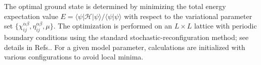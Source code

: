 \documentclass[reprint,superscriptaddress,amsmath,amssymb,aps,twocolumn]{revtex4-1}
\begin{document}
The optimal ground state is determined by minimizing the total energy expectation value $E = \langle \psi | \mathcal{H} | \psi \rangle / \langle \psi | \psi \rangle$ with respect to the variational parameter set $\{\chi_{ij}^{\alpha\beta}, \eta_{ij}^{\alpha\beta}, \mu\}$. The optimization is performed on an $L \times L$ lattice with periodic boundary conditions using the standard stochastic-reconfiguration method; see details in Refs.\cite{vmc_sorella_1,vmc_sorella_2}. For a given model parameter, calculations are initialized with various configurations to avoid local minima.
\end{document}

